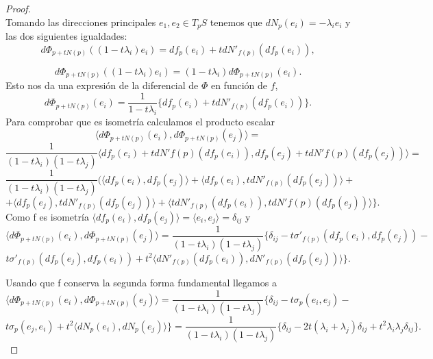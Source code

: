 \begin{proof}
	${ }$\\	
	
	Tomando las direcciones principales ${e_1, e_2} \in T_p S$ tenemos que $dN_p(e_i) = -\lambda_ie_i$ y las dos siguientes igualdades:
	${ }$\\
	\[
	d\Phi_{p + tN(p)}((1 - t\lambda_i)e_i) = df_p(e_i) + tdN'_{f(p)}(df_p(e_i)),
	\]
	
	\[
	d\Phi_{p + tN(p)}((1 - t\lambda_i)e_i) = (1 - t\lambda_i)d\Phi_{p + tN(p)}(e_i).
	\]
	${ }$\\
	
	Esto nos da una expresión de la diferencial de $\Phi$ en función de $f$,
	${ }$\\
	\[
	d\Phi_{p + tN(p)}(e_i) = \frac{1}{1 - t\lambda_i} \{df_p(e_i) + tdN'_{f(p)}(df_p(e_i))\}.
	\]
	${ }$\\
	
	Para comprobar que es isometría calculamos el producto escalar
	${ }$\\
	\[
	\langle d\Phi_{p + tN(p)}(e_i), d\Phi_{p + tN(p)}(e_j) \rangle = 
	\]
	\[
	\frac{1}{(1 - t\lambda_i)(1 - t\lambda_j)} \langle df_p(e_i) + tdN'{f(p)}(df_p(e_i)), df_p(e_j) + tdN'{f(p)}(df_p(e_j)) \rangle =
	\]
	\[
	\frac{1}{(1 - t\lambda_i)(1 - t\lambda_j)}( \langle df_p(e_i), df_p(e_j) \rangle +  \langle df_p(e_i), tdN'_{f(p)}(df_p(e_j)) \rangle + 
	\]
	\[
	+ \langle df_p(e_j), tdN'_{f(p)}(df_p(e_j)) \rangle + \langle tdN'_{f(p)}(df_p(e_i)), tdN'{f(p)}(df_p(e_j)) \rangle \}.
	\]
	${ }$\\
	
	Como f es isometría $\langle df_p(e_i), df_p(e_j) \rangle = \langle e_i, e_j \rangle = \delta_{ij}$ y
	\[
	\langle d\Phi_{p + tN(p)}(e_i), d\Phi_{p + tN(p)}(e_j) \rangle = \frac{1}{(1 - t\lambda_i)(1 - t\lambda_j)}\{\delta_{ij} - t\sigma'_{f(p)}(df_p(e_i), df_p(e_j)) -  
	\]
	\[
	t\sigma'_{f(p)}(df_p(e_j), df_p(e_i)) + t^2 \langle dN'_{f(p)}(df_p(e_i)), dN'_{f(p)}(df_p(e_j)) \rangle \}.
	\]
	
	${ }$\\	
	
	Usando que f conserva la segunda forma fundamental llegamos a
	${ }$\\
	\[
	\langle d\Phi_{p + tN(p)}(e_i), d\Phi_{p + tN(p)}(e_j) \rangle = \frac{1}{(1 - t\lambda_i)(1 - t\lambda_j)}\{\delta_{ij} - t\sigma_p(e_i, e_j) - 
	\]
	\[
	t\sigma_p(e_j, e_i) + t^2 \langle dN_p(e_i), dN_p(e_j) \rangle \} = \frac{1}{(1 - t\lambda_i)(1 - t\lambda_j)}\{\delta_{ij} - 2t(\lambda_i + \lambda_j)\delta_{ij} + t^2\lambda_i\lambda_j\delta_{ij}\}.
	\]
	${ }$\\
	

\end{proof}

